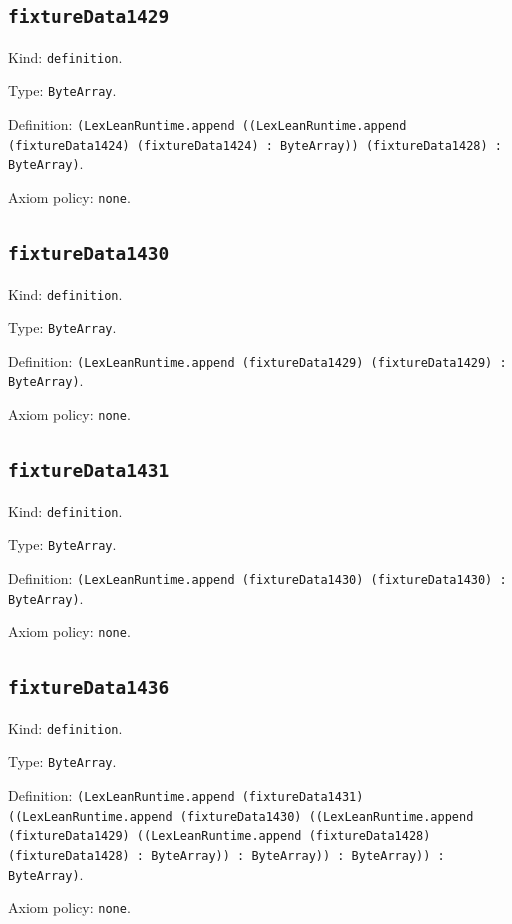 \documentclass[11pt]{article}
\begin{document}
\subsection*{\texttt{fixtureData1429}}
\noindent Kind: \texttt{definition}.\par
\noindent Type: \texttt{ByteArray}.\par
\noindent Definition: \texttt{(LexLeanRuntime.append ((LexLeanRuntime.append (fixtureData1424) (fixtureData1424) : ByteArray)) (fixtureData1428) : ByteArray)}.\par
\noindent Axiom policy: \texttt{none}.\par
\subsection*{\texttt{fixtureData1430}}
\noindent Kind: \texttt{definition}.\par
\noindent Type: \texttt{ByteArray}.\par
\noindent Definition: \texttt{(LexLeanRuntime.append (fixtureData1429) (fixtureData1429) : ByteArray)}.\par
\noindent Axiom policy: \texttt{none}.\par
\subsection*{\texttt{fixtureData1431}}
\noindent Kind: \texttt{definition}.\par
\noindent Type: \texttt{ByteArray}.\par
\noindent Definition: \texttt{(LexLeanRuntime.append (fixtureData1430) (fixtureData1430) : ByteArray)}.\par
\noindent Axiom policy: \texttt{none}.\par
\subsection*{\texttt{fixtureData1436}}
\noindent Kind: \texttt{definition}.\par
\noindent Type: \texttt{ByteArray}.\par
\noindent Definition: \texttt{(LexLeanRuntime.append (fixtureData1431) ((LexLeanRuntime.append (fixtureData1430) ((LexLeanRuntime.append (fixtureData1429) ((LexLeanRuntime.append (fixtureData1428) (fixtureData1428) : ByteArray)) : ByteArray)) : ByteArray)) : ByteArray)}.\par
\noindent Axiom policy: \texttt{none}.\par
\end{document}
